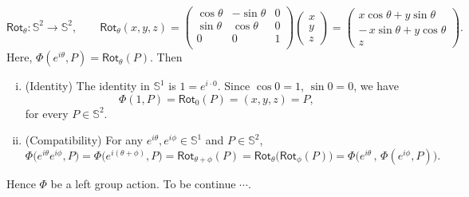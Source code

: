 \documentclass[11pt,openany]{article}
\begin{document}
\[
\mathsf{Rot}_\theta\colon \mathbb{S}^2\to \mathbb{S}^2,\qquad
\mathsf{Rot}_\theta(x,y,z)=
\begin{pmatrix}
	\cos\theta & -\sin\theta & 0 \\
	\sin\theta & \cos\theta & 0 \\
	0 & 0 & 1 \\
\end{pmatrix}
\begin{pmatrix}
	x \\ y\\ z
\end{pmatrix}
=\begin{pmatrix}
	x\cos\theta + y\sin\theta\\ -\,x\sin\theta + y\cos\theta\\ z
\end{pmatrix}.
\] Here, \(\Phi(e^{i\theta},P)=\mathsf{Rot}_\theta(P)\). Then \begin{enumerate}[(i)]
	\item (Identity) The identity in \(\mathbb{S}^1\) is \(1=e^{i\cdot0}\).  Since  
	\(\cos0=1\), \(\sin0=0\), we have \[
	\Phi(1,P)=\mathsf{Rot}_{0}(P)=(x,y,z)=P,
	\] for every \(P\in \mathbb{S}^2\).  
	\item (Compatibility) For any \(e^{i\theta},e^{i\phi}\in \mathbb{S}^1\) and \(P\in \mathbb{S}^2\),  
	\[
	\Phi\bigl(e^{i\theta}e^{i\phi},P\bigr)
	= \Phi\bigl(e^{i(\theta+\phi)},P\bigr)
	= \mathsf{Rot}_{\theta+\phi}(P)
	= \mathsf{Rot}_\theta\!\bigl(\mathsf{Rot}_\phi(P)\bigr)
	= \Phi\bigl(e^{i\theta}\,,\,\Phi(e^{i\phi},P)\bigr).
	\]
\end{enumerate}
Hence \(\Phi\) be a left group action. To be continue $\cdots$.
\end{document}

